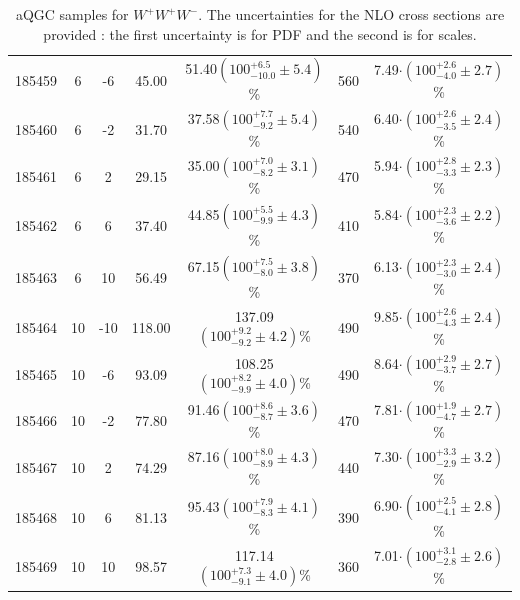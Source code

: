 \begin{table}[ht!]
{\begin{tabular}{c|c|c|c|c|c|c}
185459 & 6     &  -6  &  45.00      &    51.40$(100^{+6.5}_{-10.0}\pm 5.4  )$\%    &     560     &           7.49$\cdot (100^{+2.6}_{-4.0}\pm 2.7)$\% \\
185460 & 6     &  -2  &  31.70    &    37.58$(100^{+7.7}_{-9.2}\pm 5.4 )$\%   &       540     &           6.40$\cdot (100^{+2.6}_{-3.5}\pm 2.4)$\% \\
185461 & 6     &  2   &  29.15   &    35.00$(100^{+7.0}_{-8.2}\pm 3.1 )$\%      &     470     &           5.94$\cdot (100^{+2.8}_{-3.3}\pm 2.3)$\% \\
185462 & 6     &  6   &  37.40    &    44.85$(100^{+5.5}_{-9.9}\pm 4.3 )$\%   &       410     &           5.84$\cdot (100^{+2.3}_{-3.6}\pm 2.2)$\% \\
185463 &  6    &  10  &  56.49   &    67.15$(100^{+7.5}_{-8.0}\pm 3.8)$\%   &        370     &           6.13$\cdot (100^{+2.3}_{-3.0}\pm 2.4)$\% \\
\hline
185464 & 10    &  -10 &  118.00     &    137.09$(100^{+9.2}_{-9.2}\pm 4.2  )$\%  &     490     &           9.85$\cdot (100^{+2.6}_{-4.3}\pm 2.4)$\% \\
185465 & 10    &  -6  &  93.09   &    108.25$(100^{+8.2}_{-9.9}\pm 4.0)$\%  &        490     &           8.64$\cdot (100^{+2.9}_{-3.7}\pm 2.7)$\% \\
185466 & 10    &  -2  &  77.80    &    91.46$(100^{+8.6}_{-8.7}\pm 3.6 )$\%   &       470     &           7.81$\cdot (100^{+1.9}_{-4.7}\pm 2.7 )$\% \\
185467 & 10    &  2   &  74.29   &    87.16$(100^{+8.0}_{-8.9}\pm  4.3)$\%   &        440     &           7.30$\cdot (100^{+3.3}_{-2.9}\pm 3.2)$\% \\
185468 & 10    &  6   &  81.13   &    95.43$(100^{+7.9}_{-8.3}\pm 4.1)$\%   &        390     &           6.90$\cdot (100^{+2.5}_{-4.1}\pm 2.8)$\% \\
185469 & 10    &  10 &   98.57   &    117.14$(100^{+7.3}_{-9.1}\pm 4.0 )$\%  &        360     &           7.01$\cdot (100^{+3.1}_{-2.8}\pm 2.6)$\% \\
\hline
\end{tabular}
}
\caption{aQGC samples for $W^+W^+W^-$. The uncertainties for the NLO cross sections are provided : the first uncertainty is for PDF and the second is for scales.}
\label{tab:signalNormaPPM}
\end{table}

